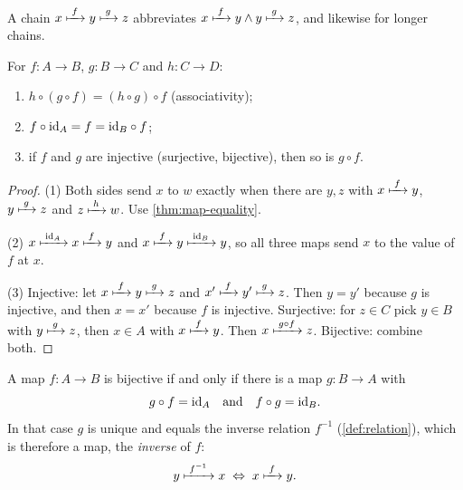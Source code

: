 \begin{definition}[Chains]
\label{def:chain}
A chain $x \xmapsto{\;f\;} y \xmapsto{\;g\;} z$ abbreviates $x \xmapsto{\;f\;} y \land y \xmapsto{\;g\;} z$, and
likewise for longer chains.
\end{definition}

\begin{theorem}
\label{thm:composition-laws}
For $f \colon A \to B$, $g \colon B \to C$ and $h \colon C \to D$:
\begin{enumerate}
  \item $h \circ (g \circ f) = (h \circ g) \circ f$ (associativity);
  \item $f \circ \mathrm{id}_A = f = \mathrm{id}_B \circ f$;
  \item if $f$ and $g$ are injective (surjective, bijective), then so is $g \circ
    f$.
\end{enumerate}
\end{theorem}

\begin{proof}
(1) Both sides send $x$ to $w$ exactly when there are $y, z$ with $x \xmapsto{\;f\;} y$, $y
\xmapsto{\;g\;} z$ and $z \xmapsto{\;h\;} w$. Use \cref{thm:map-equality}.

(2) $x \xmapsto{\;\mathrm{id}_A\;} x \xmapsto{\;f\;} y$ and $x \xmapsto{\;f\;} y \xmapsto{\;\mathrm{id}_B\;} y$, so all three maps
send $x$ to the value of $f$ at $x$.

(3) Injective: let $x \xmapsto{\;f\;} y \xmapsto{\;g\;} z$ and $x' \xmapsto{\;f\;} y' \xmapsto{\;g\;} z$. Then $y =
y'$ because $g$ is injective, and then $x = x'$ because $f$ is injective.
Surjective: for $z \in C$ pick $y \in B$ with $y \xmapsto{\;g\;} z$, then $x \in A$ with $x
\xmapsto{\;f\;} y$. Then $x \xmapsto{\;g \circ f\;} z$. Bijective: combine both.
\end{proof}

\begin{theorem}
\label{thm:inverse}
A map $f \colon A \to B$ is bijective if and only if there is a map $g \colon B
\to A$ with
\[
  g \circ f = \mathrm{id}_A \quad\text{and}\quad f \circ g = \mathrm{id}_B.
\]
In that case $g$ is unique and equals the inverse relation $f^{-1}$
(\cref{def:relation}), which is therefore a map, the \emph{inverse} of $f$:
\[
  y \xmapsto{\;f^{-1}\;} x \;\Leftrightarrow\; x \xmapsto{\;f\;} y.
\]
\end{theorem}

